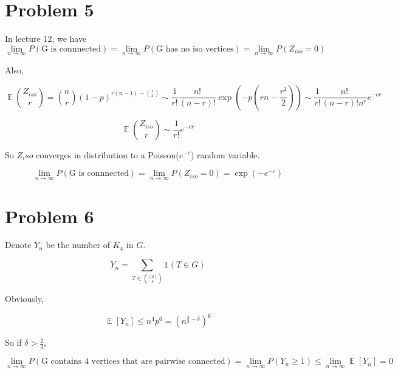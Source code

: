 \documentclass{article}
\DeclareMathOperator{\E}{\mathbb{E}}
\begin{document}
\section{Problem 5}

In lecture 12, we have
\begin{equation}
    \lim_{n\to \infty} P(\text{G is connnected}) = \lim_{n\to \infty} P(\text{G has no iso vertices})  = \lim_{n\to \infty} P(Z_{iso} = 0)
\end{equation}

Also,


\begin{equation}
    \E \binom{Z_{iso}}{r} = \binom{n}{r} (1-p)^{r(n-1) - \binom{r}{2}} \sim \frac{1}{r!} \frac{n!}{(n-r)!} \exp \left(  - p(rn - \frac{r^2}{2}) \right) \sim \frac{1}{r!} \frac {n!}{(n-r)! n^r} e^{-cr}
\end{equation} 

\begin{equation}
    \E \binom{Z_{iso}}{r} \sim \frac{1}{r!}e^{-cr}
\end{equation}

So $Z_iso $ converges in distribution to a Poisson($e^{-c}$) random variable.


\begin{equation}
    \lim_{n\to \infty} P(\text{G is connnected}) =  \lim_{n\to \infty} P(Z_{iso} = 0) = \exp\left(- e^{-c}\right)
\end{equation}


\section{Problem 6}

Denote $Y_n$ be the number of $K_4$ in $G$.

\begin{equation}
    Y_n = \sum_{T \in \binom{[n]}{4}} \mathds{1}(T\in G)
\end{equation}

Obviously,

\begin{equation}
    \E [Y_n] \leqslant n^4 p ^6  = (n^{\frac{2}{3}-\delta}  )^6
\end{equation}

So if $\delta > \frac{2}{3}$,

\begin{equation}
    \lim_{n\to\infty} P(\text{G contains 4 vertices that are pairwise connected}) = \lim_{n\to\infty} P(Y_n \geqslant 1) \leqslant \lim_{n\to\infty} \E [Y_n] = 0
\end{equation}
\end{document}
